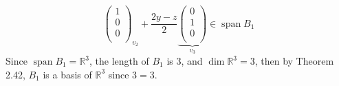 \documentclass[12pt]{article}
\newcommand{\R}{\mathbb{R}}
\begin{document}
\begin{enumerate}
$${\begin{pmatrix}
            1 \\ 0 \\ 0 \\ 
        \end{pmatrix}
    }_{v_2}
    + \frac{2y-z}{2}
    \underbrace{
        \begin{pmatrix}
            0 \\ 1 \\ 0 \\ 
        \end{pmatrix}
    }_{v_3} 
    \in \operatorname{span}B_1
    $$
    Since $\operatorname{span}B_1 = \R^3$, the length of $B_1$ is 3, and $\operatorname{dim} \R^3 = 3$, then by Theorem 2.42, $B_1$ is a basis of $\R^3$ since $3=3$.
    \vspace{0.5in}\\
    
    
    

\end{enumerate}
\end{document}
